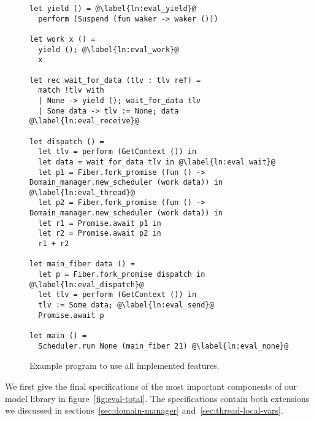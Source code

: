 \begin{figure}[ht]
  \begin{verbatim}
let yield () = @\label{ln:eval_yield}@ 
  perform (Suspend (fun waker -> waker ()))

let work x () = 
  yield (); @\label{ln:eval_work}@
  x

let rec wait_for_data (tlv : tlv ref) =
  match !tlv with
  | None -> yield (); wait_for_data tlv
  | Some data -> tlv := None; data @\label{ln:eval_receive}@

let dispatch () =
  let tlv = perform (GetContext ()) in
  let data = wait_for_data tlv in @\label{ln:eval_wait}@
  let p1 = Fiber.fork_promise (fun () -> Domain_manager.new_scheduler (work data)) in @\label{ln:eval_thread}@
  let p2 = Fiber.fork_promise (fun () -> Domain_manager.new_scheduler (work data)) in
  let r1 = Promise.await p1 in
  let r2 = Promise.await p2 in
  r1 + r2

let main_fiber data () =
  let p = Fiber.fork_promise dispatch in @\label{ln:eval_dispatch}@
  let tlv = perform (GetContext ()) in
  tlv := Some data; @\label{ln:eval_send}@
  Promise.await p

let main () = 
  Scheduler.run None (main_fiber 21) @\label{ln:eval_none}@
\end{verbatim}
  \caption{Example program to use all implemented features.}
  \label{fig:eval_code}
\end{figure}

We first give the final specifications of the most important components of our model library in figure~\ref{fig:eval-total}.
The specifications contain both extensions we discussed in sections~\ref{sec:domain-manager} and~\ref{sec:thread-local-vars}.

